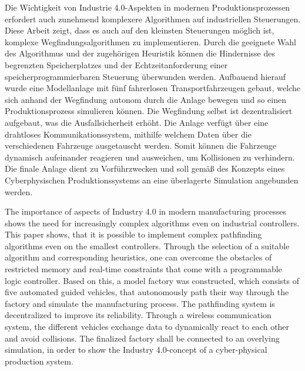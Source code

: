 {}	
\begin{abstractDuo}
	Die Wichtigkeit von Industrie 4.0-Aspekten in modernen Produktionsprozessen erfordert auch zunehmend komplexere Algorithmen auf industriellen Steuerungen. Diese Arbeit zeigt, dass es auch auf den kleinsten Steuerungen möglich ist, komplexe Wegfindungsalgorithmen zu implementieren. Durch die geeignete Wahl des Algorithmus und der zugehörigen Heuristik können die Hindernisse des begrenzten Speicherplatzes und der Echtzeitanforderung einer speicherprogrammierbaren Steuerung überwunden werden. Aufbauend hierauf wurde eine Modellanlage mit fünf fahrerlosen Transportfahrzeugen gebaut, welche sich anhand der Wegfindung autonom durch die Anlage bewegen und so einen Produktionsprozess simulieren können. Die Wegfindung selbst ist dezentralisiert aufgebaut, was die Ausfallsicherheit erhöht. Die Anlage verfügt über eine drahtloses Kommunikationssystem, mithilfe welchem Daten über die verschiedenen Fahrzeuge ausgetauscht werden. Somit können die Fahrzeuge dynamisch aufeinander reagieren und ausweichen, um Kollisionen zu verhindern. Die finale Anlage dient zu Vorführzwecken und soll  gemäß des Konzepts eines Cyberphysischen Produktionssystems an eine überlagerte Simulation angebunden werden.
\end{abstractDuo}
\begin{abstractDuo}
	The importance of aspects of Industry 4.0 in modern manufacturing processes shows the need for increasingly complex algorithms even on industrial controllers. This paper shows, that it is possible to implement complex pathfinding algorithms even on the smallest controllers. Through the selection of a suitable algorithm and corresponding heuristics, one can overcome the obstacles of restricted memory and real-time constraints that come with a programmable logic controller. Based on this, a model factory was constructed, which consists of five automated guided vehicles, that autonomously path their way through the factory and simulate the manufacturing process. The pathfinding system is decentralized to improve its reliability. Through a wireless communication system, the different vehicles exchange data to dynamically react to each other and avoid collisions. The finalized factory shall be connected to an overlying simulation, in order to show the Industry 4.0-concept of a cyber-physical production system.
\end{abstractDuo}
\clearpage
\pagestyle{plain}
\clearpage
{}
{}

